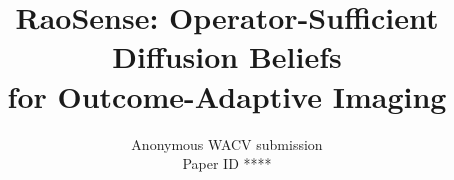 \documentclass[10pt,twocolumn,letterpaper]{article}
\def\wacvPaperID{****}
\newcommand{\method}{RaoSense}
\begin{document}
\title{\method: Operator-Sufficient Diffusion Beliefs\\
for Outcome-Adaptive Imaging}
\author{Anonymous WACV submission\\Paper ID \wacvPaperID}
\maketitle










\clearpage
{}
{\small


}
\end{document}
